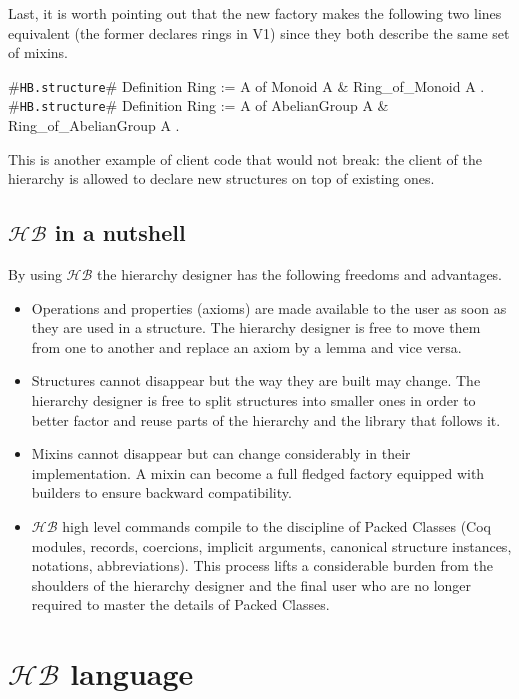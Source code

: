 \documentclass[a4paper,UKenglish,cleveref, autoref]{lipics-v2019}
\newcommand{\HB}{\ensuremath{\mathcal{HB}}}
\newcommand{\mixin}{mixin}
\newcommand{\mixins}{mixins}
\newcommand{\Mixins}{Mixins}
\newcommand{\factory}{factory}
\newcommand{\phantterms}{abbreviations}
\newcommand{\builder}{builder}
\newcommand{\hbstructure}{{\tt\color{dkgreen}HB.structure}}
\theoremstyle{implem}
\theoremstyle{implem}
\theoremstyle{command}
\begin{document}
Last, it is worth pointing out that the new \factory{} makes the following
two lines equivalent (the former declares
rings in V1) since they both describe the same set of \mixins{}.

\begin{coqcode}
#\hbstructure{}# Definition Ring := { A of Monoid A & Ring_of_Monoid A }.
#\hbstructure{}# Definition Ring := { A of AbelianGroup A & Ring_of_AbelianGroup A }.
\end{coqcode}

This is another example of client code that would not break: the client of the hierarchy is allowed to declare new
structures on top of existing ones.

\subsection{\HB{} in a nutshell}

By using \HB{} the hierarchy designer has the following freedoms and advantages.

\begin{itemize}
\item Operations and properties (axioms) are made available to the user
      as soon as they are used in a structure. The hierarchy designer
      is free to move them from one to another and replace an axiom
      by a lemma and vice versa.
\item Structures cannot disappear but the way they are built may change.
      The hierarchy designer is free to split structures into smaller
      ones in order to better factor and reuse parts of the hierarchy
      and the library that follows it.
\item \Mixins{} cannot disappear but can change considerably
      in their implementation. A \mixin{} can become a full fledged
      \factory{} equipped with \builder{}s to ensure backward compatibility.
\item \HB{} high level commands compile to
      the discipline of Packed Classes (Coq modules, records, coercions,
      implicit arguments, canonical structure instances, notations,
      \phantterms{}).
      This process lifts a considerable
      burden from the shoulders of the hierarchy designer and the final user
      who are no longer required to master the details of Packed Classes.
\end{itemize}

\section{\HB{} language}\label{sec:language}
\end{document}
